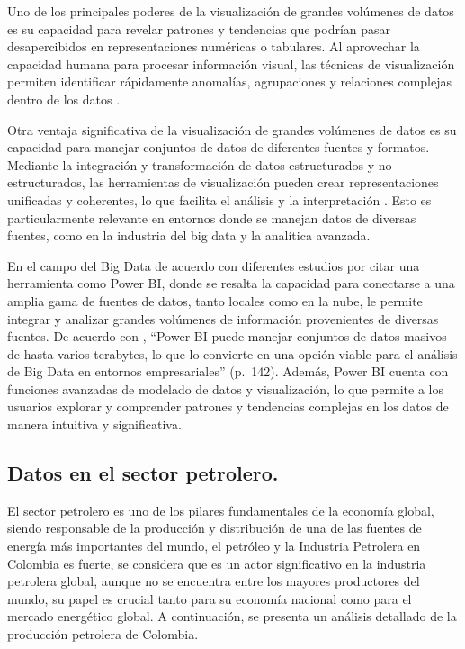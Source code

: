 \documentclass[
  11pt,
  bookmarksnumbered]{article}
\begin{document}
Uno de los principales poderes de la visualización de grandes volúmenes de datos es su capacidad para revelar patrones y tendencias que podrían pasar desapercibidos en representaciones numéricas o tabulares.
Al aprovechar la capacidad humana para procesar información visual, las técnicas de visualización permiten identificar rápidamente anomalías, agrupaciones y relaciones complejas dentro de los datos \textcite{few2009now}.

Otra ventaja significativa de la visualización de grandes volúmenes de datos es su capacidad para manejar conjuntos de datos de diferentes fuentes y formatos.
Mediante la integración y transformación de datos estructurados y no estructurados, las herramientas de visualización pueden crear representaciones unificadas y coherentes, lo que facilita el análisis y la interpretación \textcite{ware2012information}.
Esto es particularmente relevante en entornos donde se manejan datos de diversas fuentes, como en la industria del big data y la analítica avanzada.

En el campo del Big Data de acuerdo con diferentes estudios por citar una herramienta como Power BI, donde se resalta la capacidad para conectarse a una amplia gama de fuentes de datos, tanto locales como en la nube, le permite integrar y analizar grandes volúmenes de información provenientes de diversas fuentes.
De acuerdo con \textcite{aspin2019high}, ``Power BI puede manejar conjuntos de datos masivos de hasta varios terabytes, lo que lo convierte en una opción viable para el análisis de Big Data en entornos empresariales'' (p.~142).
Además, Power BI cuenta con funciones avanzadas de modelado de datos y visualización, lo que permite a los usuarios explorar y comprender patrones y tendencias complejas en los datos de manera intuitiva y significativa.

\hypertarget{datos-en-el-sector-petrolero.}{%
\subsection{Datos en el sector petrolero.}\label{datos-en-el-sector-petrolero.}}

El sector petrolero es uno de los pilares fundamentales de la economía global, siendo responsable de la producción y distribución de una de las fuentes de energía más importantes del mundo, el petróleo y la Industria Petrolera en Colombia es fuerte, se considera que es un actor significativo en la industria petrolera global, aunque no se encuentra entre los mayores productores del mundo, su papel es crucial tanto para su economía nacional como para el mercado energético global.
A continuación, se presenta un análisis detallado de la producción petrolera de Colombia.
\end{document}
